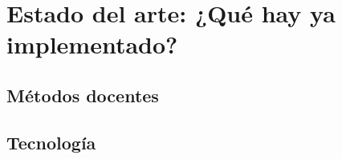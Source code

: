\chapter{Estado del arte: ¿Qué hay ya implementado?}

\section{Métodos docentes}

\section{Tecnología}
